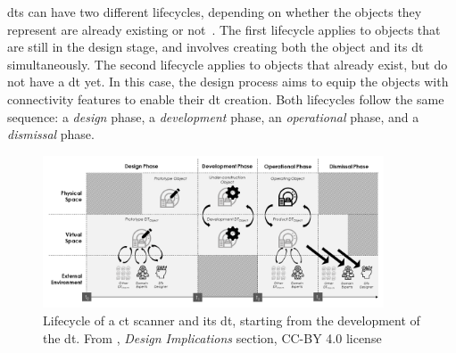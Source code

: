 \acrshort{dt}s can have two different lifecycles, depending on whether the objects they represent are already existing or not~\parencite{barricelliSurveyDigitalTwin2019}. The first lifecycle applies to objects that are still in the design stage, and involves creating both the object and its \acrshort{dt} simultaneously. The second lifecycle applies to objects that already exist, but do not have a \acrshort{dt} yet. In this case, the design process aims to equip the objects with connectivity features to enable their \acrshort{dt} creation. Both lifecycles follow the same sequence: a \textit{design} phase, a \textit{development} phase, an \textit{operational} phase, and a \textit{dismissal} phase.

\begin{figure}
    \centering
    \includegraphics[width=0.9\textwidth]{images/digital_twins/dt_lifecycle_1.png}
    \caption[Lifecycle of a \acrshort{ct} scanner and its \acrshort{dt}, starting from the development of the \acrshort{dt}]{Lifecycle of a \acrshort{ct} scanner and its \acrshort{dt}, starting from the development of the \acrshort{dt}. From \textcite{barricelliSurveyDigitalTwin2019}, \textit{Design Implications} section, CC-BY 4.0 license}%
    \label{fig:dt_lifecycle_1}
\end{figure}

